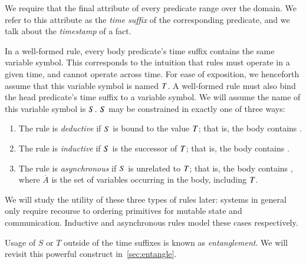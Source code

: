 We require that the final attribute of every \lang
predicate range over the  domain.  
We refer to this attribute as the \emph{time suffix} of the corresponding
predicate, and we talk about the {\em timestamp} of a fact. 


In a well-formed \lang rule, every body predicate's time suffix contains the
same variable symbol.  This corresponds to the intuition that rules must
operate in a given time, and cannot operate across time.  For ease of exposition, we henceforth assume that this
variable symbol is named $\DT$.  A well-formed \lang rule must also bind the
head predicate's time suffix to a variable symbol.  We will assume the name of
this variable symbol is $\DS$.  $\DS$ may be constrained in exactly one of
three ways:

\begin{enumerate}
%
\item The rule is {\em deductive} if $\DS$ is bound to the value
$\DT$; that is, the body contains \dedalus{$\DS$ = $\DT$}.
%
\item The rule is {\em inductive} if $\DS$ is the successor of
$\DT$; that is, the body contains .
%
\item The rule is {\em asynchronous} if $\DS$ is unrelated to $\DT$;
that is, the body contains , where $\overline{A}$ is the set of variables occurring in the body,
including $\DT$.
%
\end{enumerate}

We will study the utility of these three types of rules later: systems in
general only require recourse to ordering primitives for mutable state and communication.
Inductive and asynchronous rules model these cases respectively.

Usage of $S$ or $T$ outside of the time suffixes is known as {\em
entanglement}.  We will revisit this powerful construct in~\ref{sec:entangle}. 

